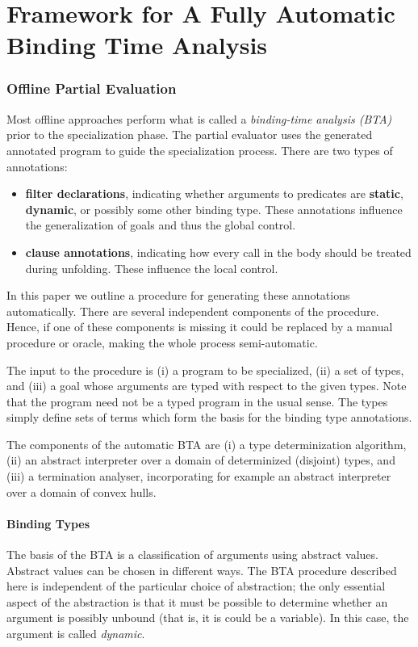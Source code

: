 \documentclass[12pt,twoside]{article}
\begin{document}
\part{Framework for A Fully Automatic Binding Time Analysis}


\section{Offline Partial Evaluation}
Most offline approaches perform what is called a {\em binding-time analysis
  ({\em BTA})} prior to the specialization phase.
The partial evaluator uses the generated annotated program to guide the specialization process.  There are two types of annotations:
\begin{itemize}
  \item {\bf filter declarations}, 
  indicating whether arguments to predicates are {\bf static},  {\bf dynamic},
or possibly some other binding type.  These annotations
influence the generalization of goals and thus the global control.
  \item {\bf clause annotations},
   indicating how every call in the body should be treated during unfolding.
   These influence the local control.  
 \end{itemize}

In this paper we outline a procedure for generating these annotations
automatically.  There are several independent components of the procedure.
Hence, if one of these components is missing it could be replaced by
a manual procedure or oracle, making the whole process semi-automatic.

The input to the procedure is (i) a program to be specialized, (ii) a set of types, and (iii)
a goal whose arguments are typed with respect to the given types.
Note that the program need not be a typed program in the usual sense.
The types simply define sets of terms which form the basis for the binding
type annotations.

The components of the automatic BTA are (i) a type determinization algorithm, (ii)
an abstract interpreter over a domain of determinized (disjoint) types, and (iii)
a termination analyser, incorporating for example an abstract interpreter over
a domain of convex hulls.

\subsection{Binding Types}
The basis of the BTA is a classification of arguments
using abstract values.  Abstract values can be chosen in different ways.
The BTA procedure described here is independent of the particular
choice of abstraction; the only essential aspect of the abstraction is that
it must be possible to determine whether an argument is possibly unbound (that
is, it is could be a variable).  In this case, the argument is called {\em dynamic}.
\end{document}
